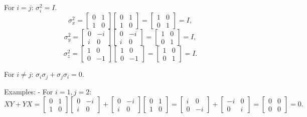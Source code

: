 \documentclass{article}
\newcommand{\0}{{$|0\rangle$}}
\newcommand{\1}{{$|1\rangle$}}
\begin{document}
For $i=j$: $\sigma_i^2 = I$.  
$$
\sigma_x^2 = \begin{bmatrix} 0 & 1 \\ 1 & 0 \end{bmatrix} \begin{bmatrix} 0 & 1 \\ 1 & 0 \end{bmatrix} = \begin{bmatrix} 1 & 0 \\ 0 & 1 \end{bmatrix} = I,
$$
$$
\sigma_y^2 = \begin{bmatrix} 0 & -i \\ i & 0 \end{bmatrix} \begin{bmatrix} 0 & -i \\ i & 0 \end{bmatrix} = \begin{bmatrix} 1 & 0 \\ 0 & 1 \end{bmatrix} = I,
$$
$$
\sigma_z^2 = \begin{bmatrix} 1 & 0 \\ 0 & -1 \end{bmatrix} \begin{bmatrix} 1 & 0 \\ 0 & -1 \end{bmatrix} = \begin{bmatrix} 1 & 0 \\ 0 & 1 \end{bmatrix} = I.
$$

For $i \neq j$: $\sigma_i \sigma_j + \sigma_j \sigma_i = 0$.  

Examples:  
- For $i=1, j=2$:  
$$
XY + YX = \begin{bmatrix} 0 & 1 \\ 1 & 0 \end{bmatrix} \begin{bmatrix} 0 & -i \\ i & 0 \end{bmatrix} + \begin{bmatrix} 0 & -i \\ i & 0 \end{bmatrix} \begin{bmatrix} 0 & 1 \\ 1 & 0 \end{bmatrix} = \begin{bmatrix} i & 0 \\ 0 & -i \end{bmatrix} + \begin{bmatrix} -i & 0 \\ 0 & i \end{bmatrix} = \begin{bmatrix} 0 & 0 \\ 0 & 0 \end{bmatrix} = 0.
$$
\end{document}
